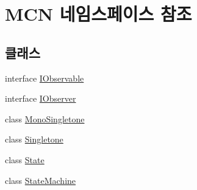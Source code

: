 \hypertarget{namespace_m_c_n}{}\section{M\+CN 네임스페이스 참조}
\label{namespace_m_c_n}
\subsection*{클래스}
\begin{DoxyCompactItemize}
\item 
interface \hyperlink{interface_m_c_n_1_1_i_observable}{I\+Observable}
\item 
interface \hyperlink{interface_m_c_n_1_1_i_observer}{I\+Observer}
\item 
class \hyperlink{class_m_c_n_1_1_mono_singletone}{Mono\+Singletone}
\item 
class \hyperlink{class_m_c_n_1_1_singletone}{Singletone}
\item 
class \hyperlink{class_m_c_n_1_1_state}{State}
\item 
class \hyperlink{class_m_c_n_1_1_state_machine}{State\+Machine}
\end{DoxyCompactItemize}
